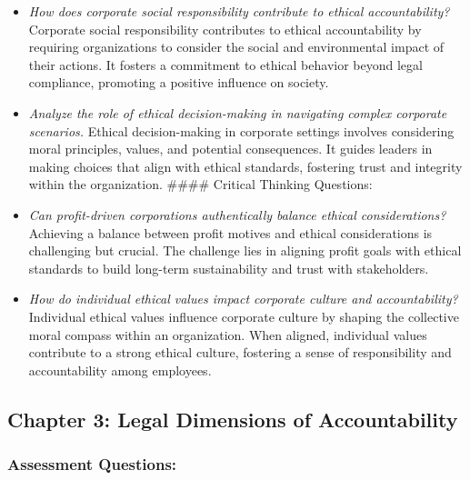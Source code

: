\documentclass[
  letterpaper,
  DIV=11,
  numbers=noendperiod]{scrreprt}
\begin{document}
\begin{itemize}
\item
  \emph{How does corporate social responsibility contribute to ethical
  accountability?} Corporate social responsibility contributes to
  ethical accountability by requiring organizations to consider the
  social and environmental impact of their actions. It fosters a
  commitment to ethical behavior beyond legal compliance, promoting a
  positive influence on society.
\item
  \emph{Analyze the role of ethical decision-making in navigating
  complex corporate scenarios.} Ethical decision-making in corporate
  settings involves considering moral principles, values, and potential
  consequences. It guides leaders in making choices that align with
  ethical standards, fostering trust and integrity within the
  organization. \#\#\#\# Critical Thinking Questions:
\item
  \emph{Can profit-driven corporations authentically balance ethical
  considerations?} Achieving a balance between profit motives and
  ethical considerations is challenging but crucial. The challenge lies
  in aligning profit goals with ethical standards to build long-term
  sustainability and trust with stakeholders.
\item
  \emph{How do individual ethical values impact corporate culture and
  accountability?} Individual ethical values influence corporate culture
  by shaping the collective moral compass within an organization. When
  aligned, individual values contribute to a strong ethical culture,
  fostering a sense of responsibility and accountability among
  employees.
\end{itemize}

\subsection{Chapter 3: Legal Dimensions of
Accountability}\label{chapter-3-legal-dimensions-of-accountability}

\subsubsection{Assessment Questions:}\label{assessment-questions-8}
\end{document}

